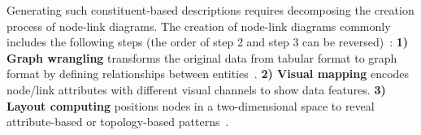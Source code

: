 Generating such constituent-based descriptions requires decomposing the creation process of node-link diagrams.
The creation of node-link diagrams commonly includes the following steps (the order of step 2 and step 3 can be reversed)~\cite{DBLP:journals/cgf/SpritzerBDFF15, tvcg/RomatAP21}:
\textbf{1) Graph wrangling} transforms the original data from tabular format to graph format by defining relationships between entities~\cite{DBLP:journals/tvcg/SrinivasanPEB18, DBLP:conf/ieeevast/BigelowNML19, DBLP:journals/ivs/HeerP14, DBLP:journals/ivs/LiuNS14}.
\textbf{2) Visual mapping} encodes node/link attributes with different visual channels to show data features. 
\textbf{3) Layout computing} positions nodes in a two-dimensional space to reveal attribute-based or topology-based patterns~\cite{DBLP:journals/cgf/NobreMSL19}.

